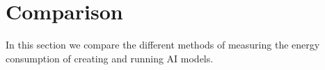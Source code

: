 \section{Comparison}

In this section we compare the different methods of measuring the energy consumption
of creating and running AI models.
